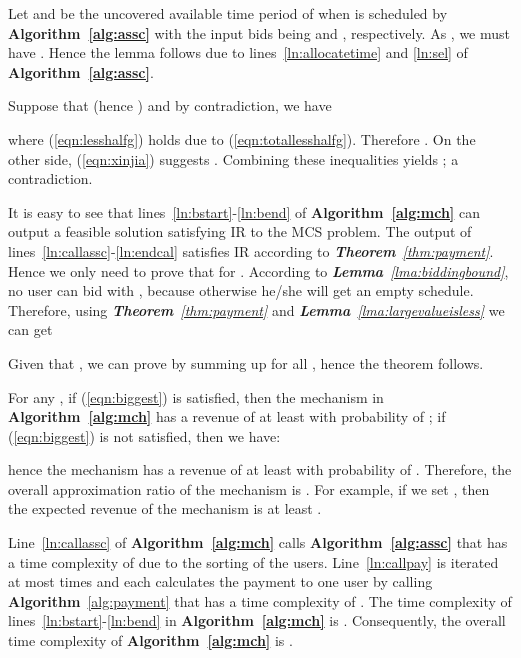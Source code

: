 \documentclass[10pt,journal,compsoc]{IEEEtran}
\begin{document}
\begin{IEEEproof}
Let  and  be the uncovered available time period of  when  is scheduled by \textbf{Algorithm~\ref{alg:assc}} with the input bids being  and , respectively. As , we must have . Hence the lemma follows due to lines~\ref{ln:allocatetime} and \ref{ln:sel} of \textbf{Algorithm~\ref{alg:assc}}.
\end{IEEEproof}

\begin{IEEEproof} 
Suppose that  (hence ) and  by contradiction, we have

where (\ref{eqn:lesshalfg}) holds due to (\ref{eqn:totallesshalfg}). Therefore . On the other side, (\ref{eqn:xinjia}) suggests . Combining these inequalities yields ; a contradiction. \end{IEEEproof}

\begin{IEEEproof}
It is easy to see that lines~\ref{ln:bstart}-\ref{ln:bend} of \textbf{Algorithm~\ref{alg:mch}} can output a feasible solution satisfying IR to the MCS problem. The output of lines~\ref{ln:callassc}-\ref{ln:endcal} satisfies IR according to \textit{\textbf{Theorem}~\ref{thm:payment}}. Hence we only need to prove that  for . According to \textit{\textbf{Lemma}~\ref{lma:biddingbound}}, no user  can bid  with , because otherwise he/she will get an empty schedule. Therefore, using \textit{\textbf{Theorem}~\ref{thm:payment}} and \textit{\textbf{Lemma}~\ref{lma:largevalueisless}} we can get

Given that , we can prove  by summing up  for all , hence the theorem follows.
\end{IEEEproof}

\begin{IEEEproof}
For any , if (\ref{eqn:biggest}) is satisfied, then the mechanism in \textbf{Algorithm~\ref{alg:mch}} has a revenue of at least  with probability of ; if (\ref{eqn:biggest}) is not satisfied, then we have:

hence the mechanism has a revenue of at least  with probability of . Therefore, the overall approximation ratio of the mechanism is . For example, if we set , then the expected revenue of the mechanism is at least .
\end{IEEEproof}

\begin{IEEEproof}
Line~\ref{ln:callassc} of \textbf{Algorithm~\ref{alg:mch}} calls \textbf{Algorithm~\ref{alg:assc}} that has a time complexity of  due to the sorting of the users. Line~\ref{ln:callpay} is iterated at most  times and each calculates the payment to one user by calling \textbf{Algorithm}~\ref{alg:payment} that has a time complexity of . The time complexity of lines~\ref{ln:bstart}-\ref{ln:bend} in \textbf{Algorithm~\ref{alg:mch}} is .  Consequently, the overall time complexity of \textbf{Algorithm~\ref{alg:mch}} is .
\end{IEEEproof}
\end{document}
